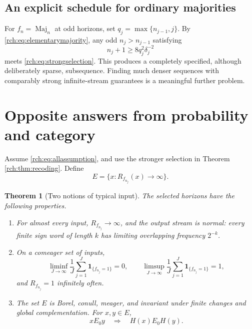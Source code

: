 \documentclass[11pt]{article}
\newtheorem{theorem}{Theorem}[section]
\theoremstyle{definition}
\theoremstyle{remark}
\newcommand{\Maj}{\operatorname{Maj}}
\newcommand{\one}{\mathbf 1}
\begin{document}
\subsection{An explicit schedule for ordinary majorities}

For \(f_n=\Maj_n\) at odd horizons, set
\(q_j=\max\{n_{j-1},j\}\). By \eqref{rch:eq:elementarymajority}, any odd
\(n_j>n_{j-1}\) satisfying
\begin{equation}
 n_j+1\ge8q_j^2\delta_j^{-2}
 \label{rch:eq:explicitschedule}
\end{equation}
meets \eqref{rch:eq:strongselection}. This produces a completely specified,
although deliberately sparse, subsequence. Finding much denser sequences with
comparably strong infinite-stream guarantees is a meaningful further problem.

\section{Opposite answers from probability and category}
\label{rch:sec:category}

Assume \eqref{rch:eq:allassumption}, and use the stronger selection in Theorem
\ref{rch:thm:recoding}. Define
\begin{equation}
 E=\{x:R_{f_{n_j}}(x)\to\infty\}.
 \label{rch:eq:E}
\end{equation}

\begin{theorem}[Two notions of typical input]
\label{rch:thm:typical}
The selected horizons have the following properties.
\begin{enumerate}[label=(\roman*)]
\item For almost every input, \(R_{f_{n_j}}\to\infty\), and the output
stream is normal: every finite sign word of length \(k\) has limiting
overlapping frequency \(2^{-k}\).
\item On a comeager set of inputs,
\begin{equation}
 \liminf_{J\to\infty}\frac1J\sum_{j=1}^J\one_{\{f_{n_j}=1\}}=0,
 \qquad
 \limsup_{J\to\infty}\frac1J\sum_{j=1}^J\one_{\{f_{n_j}=1\}}=1,
 \label{rch:eq:wildfreq}
\end{equation}
and \(R_{f_{n_j}}=1\) infinitely often.
\item The set \(E\) is Borel, conull, meager, and invariant under finite
changes and global complementation. For \(x,y\in E\),
\begin{equation}
 x\mathrel{E_0}y\quad\Longrightarrow\quad H(x)\mathrel{E_0}H(y).
 \label{rch:eq:E0hom}
\end{equation}
\end{enumerate}
\end{theorem}
\end{document}
